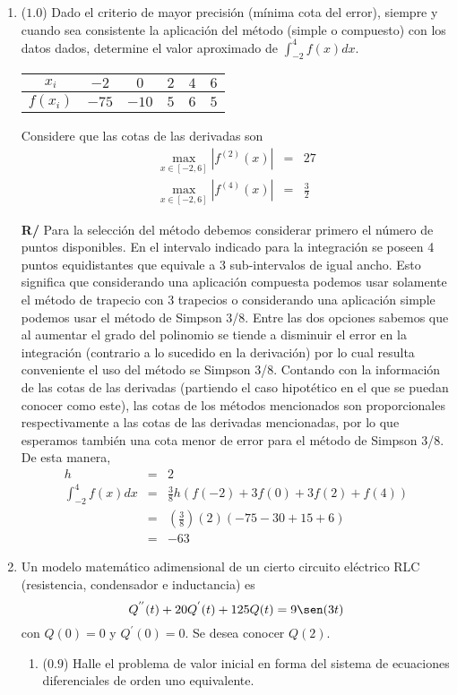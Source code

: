 \documentclass[12pt]{article}
\begin{document}
\vspace{-.5cm}
  \begin{enumerate}[leftmargin=*,widest=9]
    \item (\(1.0\)) Dado el criterio de mayor precisión (mínima cota del error), siempre y cuando sea consistente la aplicación del método (simple o compuesto) con los datos dados, determine el valor aproximado de \(\int_{-2}^4 f(x)dx\).
\begin{center}
\begin{tabular}{|c|c|c|c|c|c|}
\hline
$x_i$ & $-2$ & $0$ & $2$ & $4$ & $6$\\ \hline
$f(x_i)$ & $-75$ & $-10$ & $5$ & $6$ & $5$\\
\hline
\end{tabular}
\end{center}
Considere que las cotas de las derivadas son
\begin{eqnarray*}
\max_{x\in [-2,6]} |f^{(2)}(x)| &=& 27 \\
\max_{x\in [-2,6]} |f^{(4)}(x)| &=& \frac{3}{2}
\end{eqnarray*}

\textbf{R/} Para la selección del método debemos considerar primero el número de puntos disponibles. En el intervalo indicado para la integración se poseen 4 puntos equidistantes que equivale a 3 sub-intervalos de igual ancho. Esto significa que considerando una aplicación compuesta podemos usar solamente el método de trapecio con 3 trapecios o considerando una aplicación simple podemos usar el método de Simpson 3/8.
Entre las dos opciones sabemos que al aumentar el grado del polinomio se tiende a disminuir el error en la integración (contrario a lo sucedido en la derivación) por lo cual resulta conveniente el uso del método se Simpson 3/8. Contando con la información de las cotas de las derivadas (partiendo el caso hipotético en el que se puedan conocer como este), las cotas de los métodos mencionados son proporcionales respectivamente a las cotas de las derivadas mencionadas, por lo que esperamos también una cota menor de error para el método de Simpson 3/8.
De esta manera,
\begin{eqnarray*}
h & = & 2\\
\int_{-2}^{4}f(x)dx &=& \frac{3}{8}h\left(f(-2) + 3f(0) + 3f(2) + f(4) \right)\\
&=& \left(\frac{3}{8}\right)(2)(-75-30+15+6)\\
&=&-63
\end{eqnarray*}
\item Un modelo matemático adimensional de un cierto circuito eléctrico RLC (resistencia, condensador e inductancia) es $$Q^{''}(t)+20Q^{'}(t)+125Q(t)=9\sen(3t) $$ con $Q(0)=0$ y $Q^{'}(0)=0$. Se desea conocer \(Q(2)\).
    \begin{enumerate}[label=\alph*]
    \item (\(0.9\)) Halle el problema de valor inicial en forma del sistema de ecuaciones diferenciales de orden uno equivalente.


\end{enumerate}
\end{enumerate}
\end{document}
